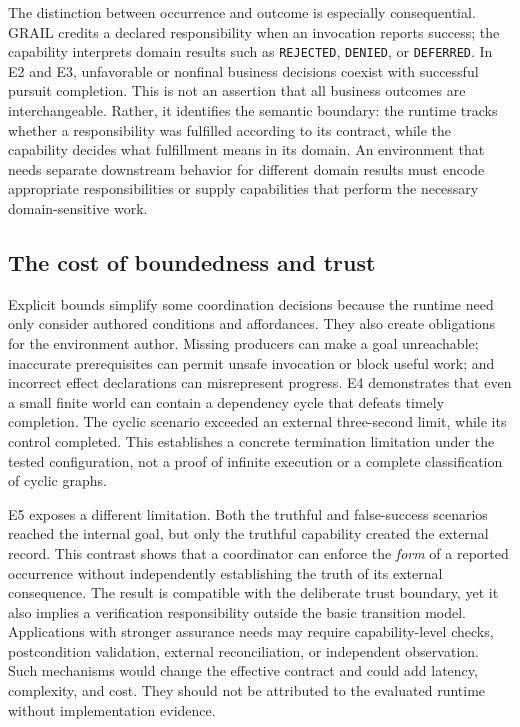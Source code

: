 \documentclass[11pt]{article}
\begin{document}
The distinction between occurrence and outcome is especially consequential. GRAIL credits a declared responsibility when an invocation reports success; the capability interprets domain results such as \texttt{REJECTED}, \texttt{DENIED}, or \texttt{DEFERRED}. In E2 and E3, unfavorable or nonfinal business decisions coexist with successful pursuit completion. This is not an assertion that all business outcomes are interchangeable. Rather, it identifies the semantic boundary: the runtime tracks whether a responsibility was fulfilled according to its contract, while the capability decides what fulfillment means in its domain. An environment that needs separate downstream behavior for different domain results must encode appropriate responsibilities or supply capabilities that perform the necessary domain-sensitive work.

\subsection{The cost of boundedness and trust}
Explicit bounds simplify some coordination decisions because the runtime need only consider authored conditions and affordances. They also create obligations for the environment author. Missing producers can make a goal unreachable; inaccurate prerequisites can permit unsafe invocation or block useful work; and incorrect effect declarations can misrepresent progress. E4 demonstrates that even a small finite world can contain a dependency cycle that defeats timely completion. The cyclic scenario exceeded an external three-second limit, while its control completed. This establishes a concrete termination limitation under the tested configuration, not a proof of infinite execution or a complete classification of cyclic graphs.

E5 exposes a different limitation. Both the truthful and false-success scenarios reached the internal goal, but only the truthful capability created the external record. This contrast shows that a coordinator can enforce the \emph{form} of a reported occurrence without independently establishing the truth of its external consequence. The result is compatible with the deliberate trust boundary, yet it also implies a verification responsibility outside the basic transition model. Applications with stronger assurance needs may require capability-level checks, postcondition validation, external reconciliation, or independent observation. Such mechanisms would change the effective contract and could add latency, complexity, and cost. They should not be attributed to the evaluated runtime without implementation evidence.
\end{document}
